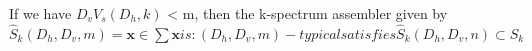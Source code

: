 \documentclass[preview]{standalone}
\begin{document}
\begin{center}
If we have ${D}_v{V}_s({D}_h, k)$ < m, then the k-spectrum assembler given by $\hat{S}_k({D}_h, {D}_v, m) = {\textbf{x} \in \sum \textbf{x} is : ({D}_h, {D}_v, m)-typical} satisfies \hat{S}_k({D}_h, {D}_v, n) \subset {S}_k$
\end{center}
\end{document}
